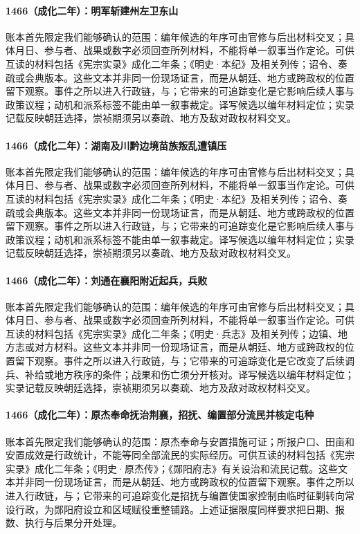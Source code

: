 \paragraph{1466（成化二年）：明军斩建州左卫东山} 账本首先限定我们能够确认的范围：编年候选的年序可由官修与后出材料交叉；具体月日、参与者、战果或数字必须回查所列材料，不能将单一叙事当作定论。可供互读的材料包括《宪宗实录》成化二年条；《明史·本纪》及相关列传；诏令、奏疏或会典版本。这些文本并非同一份现场证言，而是从朝廷、地方或跨政权的位置留下观察。事件之所以进入行政链，与；它带来的可追踪变化是它影响后续人事与政策议程；动机和派系标签不能由单一叙事裁定。译写候选以编年材料定位；实录记载反映朝廷选择，崇祯期须另以奏疏、地方及敌对政权材料交叉。

\paragraph{1466（成化二年）：湖南及川黔边境苗族叛乱遭镇压} 账本首先限定我们能够确认的范围：编年候选的年序可由官修与后出材料交叉；具体月日、参与者、战果或数字必须回查所列材料，不能将单一叙事当作定论。可供互读的材料包括《宪宗实录》成化二年条；《明史·本纪》及相关列传；诏令、奏疏或会典版本。这些文本并非同一份现场证言，而是从朝廷、地方或跨政权的位置留下观察。事件之所以进入行政链，与；它带来的可追踪变化是它影响后续人事与政策议程；动机和派系标签不能由单一叙事裁定。译写候选以编年材料定位；实录记载反映朝廷选择，崇祯期须另以奏疏、地方及敌对政权材料交叉。

\paragraph{1466（成化二年）：刘通在襄阳附近起兵，兵败} 账本首先限定我们能够确认的范围：编年候选的年序可由官修与后出材料交叉；具体月日、参与者、战果或数字必须回查所列材料，不能将单一叙事当作定论。可供互读的材料包括《宪宗实录》成化二年条；《明史·兵志》及相关列传；边镇、地方志或对方材料。这些文本并非同一份现场证言，而是从朝廷、地方或跨政权的位置留下观察。事件之所以进入行政链，与；它带来的可追踪变化是它改变了后续调兵、补给或地方秩序的条件；战果和伤亡须分开核对。译写候选以编年材料定位；实录记载反映朝廷选择，崇祯期须另以奏疏、地方及敌对政权材料交叉。

\paragraph{1466（成化二年）：原杰奉命抚治荆襄，招抚、编置部分流民并核定屯种} 账本首先限定我们能够确认的范围：原杰奉命与安置措施可证；所报户口、田亩和安置成效是行政统计，不能等同全部流民的实际经历。可供互读的材料包括《宪宗实录》成化二年条；《明史·原杰传》；《郧阳府志》有关设治和流民记载。这些文本并非同一份现场证言，而是从朝廷、地方或跨政权的位置留下观察。事件之所以进入行政链，与；它带来的可追踪变化是招抚与编置使国家控制由临时征剿转向常设行政，为郧阳府设立和区域赋役重整铺路。上述证据限度同样要求把日期、报数、执行与后果分开处理。

